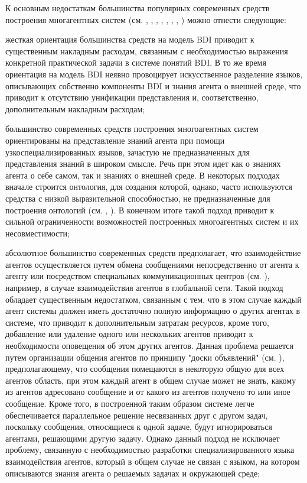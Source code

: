 К основным недостаткам большинства популярных современных средств построения многагентных систем (см. , , , ,	, , , ) можно отнести следующие:
\begin{textitemize}
\item жесткая ориентация большинства средств на модель BDI приводит к существенным накладным расходам, связанным с необходимостью выражения конкретной практической задачи в системе понятий BDI. В то же время ориентация на модель BDI неявно провоцирует искусственное разделение языков, описывающих собственно компоненты BDI и знания агента о внешней среде, что приводит к отсутствию унификации представления и, соответственно, дополнительным накладным расходам;
\item большинство современных средств построения многоагентных систем ориентированы на представление знаний агента при помощи узкоспециализированных языков, зачастую не предназначенных для представления знаний в широком смысле. Речь при этом идет как о знаниях агента о себе самом, так и знаниях о внешней среде. В некоторых подходах вначале строится онтология, для создания которой, однако, часто используются средства с низкой выразительной способностью, не предназначенные для построения онтологий (см. , ). В конечном итоге такой подход приводит к сильной ограниченности возможностей построенных многоагентных систем и их несовместимости;
\item абсолютное большинство современных средств предполагает, что взаимодействие агентов осуществляется путем обмена сообщениями непосредственно от агента к агенту или посредством специальных коммуникационных центров (см. ), например, в случае взаимодействия агентов в глобальной сети. Такой подход обладает существенным недостатком, связанным с тем, что в этом случае каждый агент системы должен иметь достаточно полную информацию о других агентах в системе, что приводит к дополнительным затратам ресурсов, кроме того, добавление или удаление одного или нескольких агентов приводит к необходимости оповещения об этом других агентов. Данная проблема решается путем организации общения агентов по принципу "доски объявлений"{} (см. ), предполагающему, что сообщения помещаются в некоторую общую для всех агентов область, при этом каждый агент в общем случае может не знать, какому из агентов адресовано сообщение и от какого из агентов получено то или иное сообщение. Кроме того, в построенной таким образом системе легче обеспечивается параллельное решение несвязанных друг с другом задач, поскольку сообщения, относящиеся к одной задаче, будут игнорироваться агентами, решающими другую задачу. Однако данный подход не исключает проблему, связанную с необходимостью разработки специализированного языка взаимодействия агентов, который в общем случае не связан с языком, на котором описываются знания агента о решаемых задачах и окружающей среде;

\end{textitemize}
